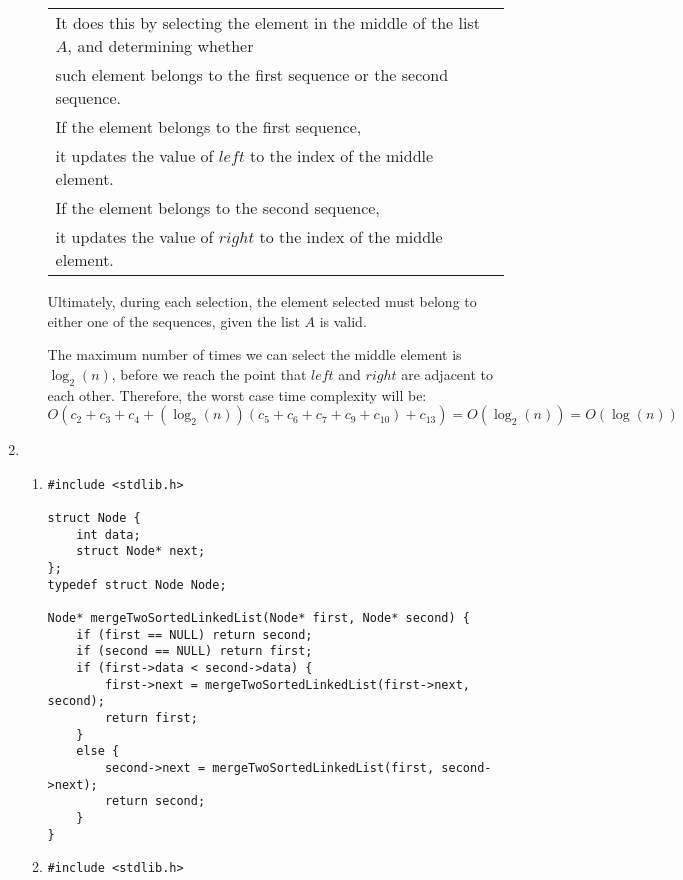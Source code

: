 \documentclass{article}
\begin{document}
\begin{enumerate}
\begin{enumerate}[label=(\alph*)]
        \begin{tabular}{@{}l@{\hspace{1em}}l@{}}
            It does this by selecting the element in the middle of the list $A$, and determining whether & \dotfill \\
            such element belongs to the first sequence or the second sequence. & \dotfill \\
            \quad * If the element belongs to the first sequence, & \dotfill \\ 
            \quad \quad it updates the value of $left$ to the index of the middle element. & \dotfill \\
            \quad * If the element belongs to the second sequence, & \dotfill \\ 
            \quad \quad it updates the value of $right$ to the index of the middle element. & \dotfill \\
        \end{tabular}
            

        Ultimately, during each selection, the element selected must belong to either one of the sequences, given the list $A$ is valid.

        The maximum number of times we can select the middle element is $\log_2(n)$, before we reach the point that $left$ and $right$ are adjacent to each other. Therefore, the worst case time complexity will be:
        \[
        O(c_2+c_3+c_4+(\log_2(n))(c_5+c_6+c_7+c_9+c_10)+c_13) = O(\log_2(n)) = O(\log(n))
        \]
    \end{enumerate}

\item
    \begin{enumerate}[label=(\alph*)]
        \item
        \begin{verbatim}
#include <stdlib.h>

struct Node {
    int data;
    struct Node* next;
};
typedef struct Node Node;

Node* mergeTwoSortedLinkedList(Node* first, Node* second) {
    if (first == NULL) return second;
    if (second == NULL) return first;
    if (first->data < second->data) {
        first->next = mergeTwoSortedLinkedList(first->next, second);
        return first;
    }
    else {
        second->next = mergeTwoSortedLinkedList(first, second->next);
        return second;
    }
}
        \end{verbatim}

        \item
        \begin{verbatim}
#include <stdlib.h>


\end{verbatim}
\end{enumerate}
\end{enumerate}
\end{document}
